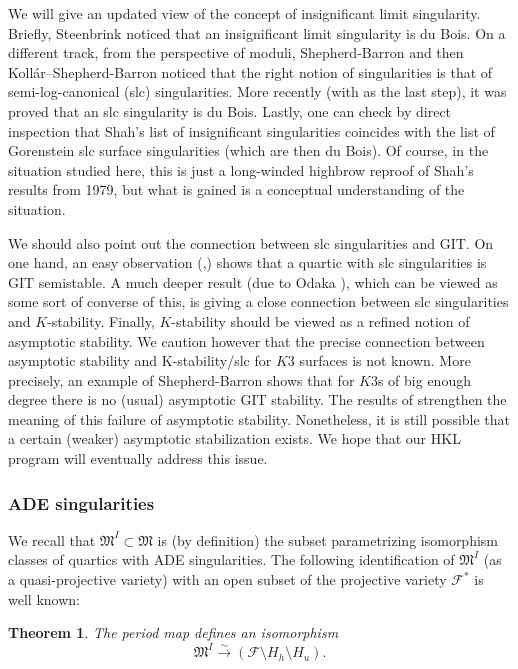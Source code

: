 \documentclass[11pt]{amsart}
\numberwithin{equation}{section}
\theoremstyle{plain}
\newtheorem{theorem}{Theorem}[section]
\theoremstyle{remark}
\theoremstyle{definition}
\newcommand{\cF}{\mathscr{F}}
\newcommand{\gM}{\mathfrak{M}}
\newcommand{\lra}{\longrightarrow}
\begin{document}
We will  give an updated view of the concept of  insignificant limit singularity. Briefly, Steenbrink \cite{steenbrinkinsignificant} noticed that an insignificant limit singularity
is du Bois. On a different track, from the  perspective of moduli, Shepherd-Barron \cite{sbnef} and then Koll\'ar--Shepherd-Barron \cite{ksb} noticed that the right notion of singularities is that of semi-log-canonical (slc) singularities. More recently (with \cite{kk} as the last step), it was proved that an slc singularity is du Bois. Lastly, one can check by direct inspection that Shah's list of insignificant singularities coincides with the list of Gorenstein slc surface singularities (which are then du Bois). Of course, in the situation studied here, this is just a long-winded highbrow reproof of Shah's results from 1979, but what is gained is a conceptual understanding of the situation. 

We should also point out the connection between slc singularities and GIT. On one hand, an easy observation (\cite{hacking},\cite{kimlee}) shows that a quartic with slc singularities is GIT semistable. A much deeper result (due to Odaka \cite{odakacy,odaka}), which can be viewed as some sort of converse of this, is giving a close connection between slc singularities and $K$-stability. Finally, $K$-stability should be viewed as a refined notion of asymptotic stability. We caution however that the precise connection between asymptotic stability and K-stability/slc for $K3$ surfaces is not known. More precisely, an example of Shepherd-Barron \cite{sbnef,sbpolarization} shows that for $K3$s of big enough degree there is no (usual) asymptotic GIT stability. The results of \cite{wangxu} strengthen the meaning of this failure of asymptotic stability. Nonetheless, it is still possible that a certain (weaker) asymptotic stabilization exists. We  hope that  our HKL program will  eventually address this issue. 
%
\subsubsection{ADE singularities}
%
We recall that  $\gM^{I}\subset\gM$ is (by definition)  the subset parametrizing isomorphism classes of quartics with  ADE singularities.  
The following identification of $\gM^{I}$ (as a quasi-projective variety) with an open  subset of the projective variety $\cF^*$ is well known:
%
\begin{theorem}\label{thm:circeo}
%
The period map defines an isomorphism
% 
$$\gM^I\overset{\sim}{\lra} (\cF\setminus H_h\setminus H_u).$$
%
\end{theorem}
%
\end{document}
